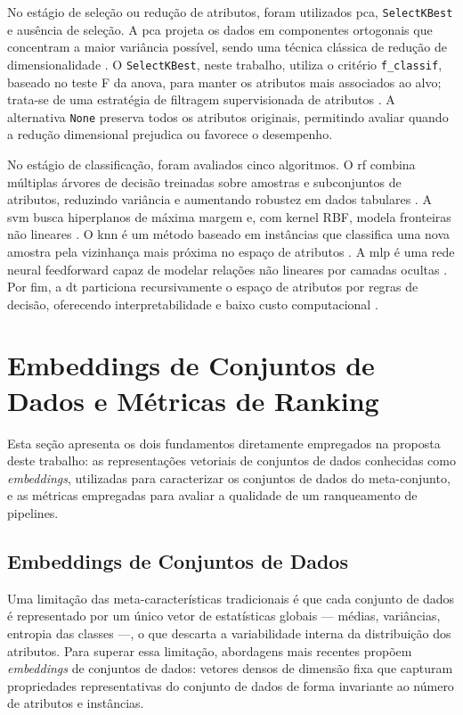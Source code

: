 No estágio de seleção ou redução de atributos, foram utilizados \gls{pca}, \texttt{SelectKBest} e ausência de seleção. A \gls{pca} projeta os dados em componentes ortogonais que concentram a maior variância possível, sendo uma técnica clássica de redução de dimensionalidade \cite{Jolliffe2002}. O \texttt{SelectKBest}, neste trabalho, utiliza o critério \texttt{f\_classif}, baseado no teste F da \gls{anova}, para manter os atributos mais associados ao alvo; trata-se de uma estratégia de filtragem supervisionada de atributos \cite{Guyon2003}. A alternativa \texttt{None} preserva todos os atributos originais, permitindo avaliar quando a redução dimensional prejudica ou favorece o desempenho.

No estágio de classificação, foram avaliados cinco algoritmos. O \gls{rf} combina múltiplas árvores de decisão treinadas sobre amostras e subconjuntos de atributos, reduzindo variância e aumentando robustez em dados tabulares \cite{Breiman2001}. A \gls{svm} busca hiperplanos de máxima margem e, com kernel RBF, modela fronteiras não lineares \cite{Cortes1995}. O \gls{knn} é um método baseado em instâncias que classifica uma nova amostra pela vizinhança mais próxima no espaço de atributos \cite{Cover1967}. A \gls{mlp} é uma rede neural feedforward capaz de modelar relações não lineares por camadas ocultas \cite{Bishop2006}. Por fim, a \gls{dt} particiona recursivamente o espaço de atributos por regras de decisão, oferecendo interpretabilidade e baixo custo computacional \cite{Quinlan1986}.

\section{Embeddings de Conjuntos de Dados e Métricas de Ranking}
\label{sec:embeddingsRanking}

Esta seção apresenta os dois fundamentos diretamente empregados na proposta deste trabalho: as representações vetoriais de conjuntos de dados conhecidas como \textit{embeddings}, utilizadas para caracterizar os conjuntos de dados do meta-conjunto, e as métricas empregadas para avaliar a qualidade de um ranqueamento de pipelines.

\subsection{Embeddings de Conjuntos de Dados}

Uma limitação das meta-características tradicionais é que cada conjunto de dados é representado por um único vetor de estatísticas globais — médias, variâncias, entropia das classes —, o que descarta a variabilidade interna da distribuição dos atributos. Para superar essa limitação, abordagens mais recentes propõem \textit{embeddings} de conjuntos de dados: vetores densos de dimensão fixa que capturam propriedades representativas do conjunto de dados de forma invariante ao número de atributos e instâncias.

